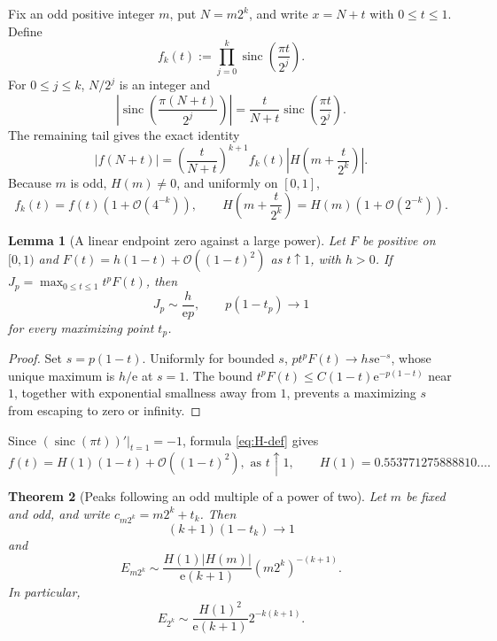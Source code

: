 \documentclass[11pt,oneside]{article}
\newtheorem{theorem}{Theorem}[section]
\newtheorem{lemma}[theorem]{Lemma}
\theoremstyle{definition}
\theoremstyle{remark}
\newcommand{\e}{\mathrm e}
\newcommand{\sinc}{\operatorname{sinc}}
\newcommand{\bigO}{\mathcal O}
\begin{document}
Fix an odd positive integer $m$, put $N=m2^k$, and write $x=N+t$ with
$0\le t\le1$.  Define
\begin{equation}
 f_k(t):=\prod_{j=0}^{k}\sinc\!\left(\frac{\pi t}{2^j}\right).
 \label{eq:fk}
\end{equation}
For $0\le j\le k$, $N/2^j$ is an integer and
\begin{equation}
 \left|\sinc\!\left(\frac{\pi(N+t)}{2^j}\right)\right|
 =\frac{t}{N+t}\sinc\!\left(\frac{\pi t}{2^j}\right).
\end{equation}
The remaining tail gives the exact identity
\begin{equation}
 |f(N+t)|
 =\left(\frac{t}{N+t}\right)^{k+1}
 f_k(t)\left|H\!\left(m+\frac{t}{2^k}\right)\right|.
 \label{eq:near-m2k}
\end{equation}
Because $m$ is odd, $H(m)\ne0$, and uniformly on $[0,1]$,
\begin{equation}
 f_k(t)=f(t)(1+\bigO(4^{-k})),
 \qquad
 H\!\left(m+\frac{t}{2^k}\right)=H(m)(1+\bigO(2^{-k})).
 \label{eq:tail-uniform}
\end{equation}

\begin{lemma}[A linear endpoint zero against a large power]
\label{lem:boundary-max}
Let $F$ be positive on $[0,1)$ and
$F(t)=h(1-t)+\bigO((1-t)^2)$ as $t\uparrow1$, with $h>0$.  If
$J_p=\max_{0\le t\le1}t^pF(t)$, then
\begin{equation}
 J_p\sim\frac{h}{\e p},
 \qquad
 p(1-t_p)\longrightarrow1
 \label{eq:boundary-max}
\end{equation}
for every maximizing point $t_p$.
\end{lemma}

\begin{proof}
Set $s=p(1-t)$.  Uniformly for bounded $s$,
$p t^pF(t)\to hs\e^{-s}$, whose unique maximum is $h/\e$ at $s=1$.
The bound $t^pF(t)\le C(1-t)\e^{-p(1-t)}$ near $1$, together with exponential
smallness away from $1$, prevents a maximizing $s$ from escaping to zero or
infinity.
\end{proof}

Since $(\sinc(\pi t))'|_{t=1}=-1$, formula \eqref{eq:H-def} gives
\begin{equation}
 f(t)=H(1)(1-t)+\bigO((1-t)^2),
 \text{ as }t\uparrow1,
 \qquad
 H(1)=0.553771275888810\ldots .
 \label{eq:f-near-one}
\end{equation}

\begin{theorem}[Peaks following an odd multiple of a power of two]
\label{thm:two-adic-peaks}
Let $m$ be fixed and odd, and write $c_{m2^k}=m2^k+t_k$.  Then
\begin{equation}
 (k+1)(1-t_k)\longrightarrow1
 \label{eq:peak-location-two-adic}
\end{equation}
and
\begin{equation}
 \boxed{
 E_{m2^k}\sim
 \frac{H(1)|H(m)|}{\e(k+1)}(m2^k)^{-(k+1)}.}
 \label{eq:two-adic-peak}
\end{equation}
In particular,
\begin{equation}
 E_{2^k}\sim
 \frac{H(1)^2}{\e(k+1)}2^{-k(k+1)}.
 \label{eq:power-two-peak}
\end{equation}
\end{theorem}
\end{document}
